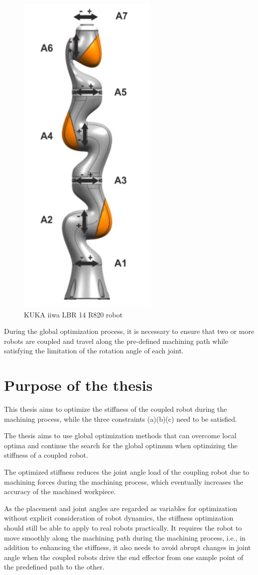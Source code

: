 \begin{figure}[h!]
	\centering
	\includegraphics[scale=1]{03_images/kuka_7.JPG}
	\caption{KUKA iiwa LBR 14 R820 robot}
	\label{fig:Introduction:kuka}
\end{figure}
During the global optimization process, it is necessary to ensure that two or more robots are coupled and travel along the pre-defined machining path while satisfying the limitation of the rotation angle of each joint.
\section{Purpose of the thesis} \label{sec:Introduction:Purpose}
This thesis aims to optimize the stiffness of the coupled robot during the machining process, while the three constraints (a)(b)(c) need to be satisfied.\par
The thesis aims to use global optimization methods that can overcome local optima and continue the search for the global optimum when optimizing the stiffness of a coupled robot.\par
The optimized stiffness reduces the joint angle load of the coupling robot due to machining forces during the machining process, which eventually increases the accuracy of the machined workpiece.\par
As the placement and joint angles are regarded as variables for optimization without explicit consideration of robot dynamics, the stiffness optimization should still be able to apply to real robots practically. It requires the robot to move smoothly along the machining path during the machining process, i.e., in addition to enhancing the stiffness, it also needs to avoid abrupt changes in joint angle when the coupled robots drive the end effector from one sample point of the predefined path to the other.
